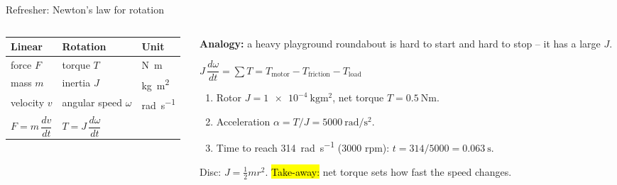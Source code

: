 \documentclass[aspectratio=169,10pt]{beamer}
\begin{document}
\begin{frame}{Refresher: Newton's law for rotation}
\begin{columns}[T]
\begin{column}{.42\textwidth}
\centering
{}

\vspace{1mm}
\small
\renewcommand{\arraystretch}{1.1}
\begin{tabular}{@{}lll@{}}
\toprule
\textbf{Linear} & \textbf{Rotation} & \textbf{Unit}\\
\midrule
force $F$ & torque $T$ & \si{\newton\metre}\\
mass $m$ & inertia $J$ & \si{\kilo\gram\metre\squared}\\
velocity $v$ & angular speed $\omega$ & \si{\radian\per\second}\\
$F=m\,\dfrac{dv}{dt}$ & $T=J\,\dfrac{d\omega}{dt}$ & \\
\bottomrule
\end{tabular}
\end{column}
\begin{column}{.55\textwidth}
\small
\textbf{Analogy:} a heavy playground roundabout is hard to start and hard to stop -- it has a large  $J$.
\begin{eqbox}
$J\,\dfrac{d\omega}{dt} = \sum T = T_\text{motor} - T_\text{friction} - T_\text{load}$
\end{eqbox}
\begin{defbox}
\small
\begin{enumerate}\setlength\itemsep{1pt}
\item Rotor $J=\SI{1e-4}{\kilo\gram\metre\squared}$, net torque $T=\SI{0.5}{\newton\metre}$.
\item Acceleration $\alpha=T/J=\SI{5000}{\radian\per\second\squared}$.
\item Time to reach \SI{314}{\radian\per\second} (3000 rpm): $t=314/5000=\SI{0.063}{\second}$.
\end{enumerate}
\end{defbox}
Disc: $J=\tfrac12 m r^2$. \hl{Take-away:} net torque sets how fast the speed changes.
\end{column}
\end{columns}
\end{frame}
\end{document}
